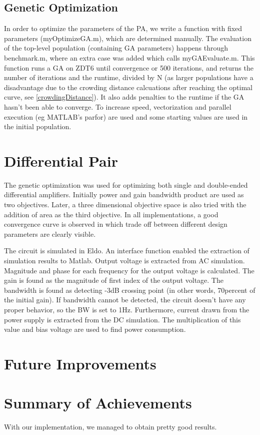 \subsection{Genetic Optimization} 
In order to optimize the parameters of the PA, we write a function with fixed parameters (myOptimizeGA.m), which are determined manually.
The evaluation of the top-level population (containing GA parameters) happens through benchmark.m, where an extra case was added which calls myGAEvaluate.m.
This function runs a GA on ZDT6 until convergence or 500 iterations, and returns the number of iterations and the runtime, divided by N (as larger populations have a disadvantage due to the crowding distance calcuations after reaching the optimal curve, see \ref{crowdingDistance}). It also adds penalties to the runtime if the GA hasn't been able to converge.
To increase speed, vectorization and parallel execution (eg MATLAB's parfor) are used and some starting values are used in the initial population. \\

\section{Differential Pair} 

The genetic optimization was used for optimizing both single and double-ended differential amplifiers. Initially power and gain bandwidth product are used as two objectives. Later, a three dimensional objective space is also tried with the addition of area as the third objective. In all implementations, a good convergence curve is observed in which trade off between different design parameters are clearly visible. 

The circuit is simulated in Eldo. An interface function enabled the extraction of simulation results to Matlab. Output voltage is extracted from AC simulation. Magnitude and phase for each frequency for the output voltage is calculated. The gain is found as the magnitude of first index of the output voltage. The bandwidth is found as detecting -3dB crossing point (in other words, 70percent of the initial gain). If bandwidth cannot be detected, the circuit doesn't have any proper behavior, so the BW is set to 1Hz. Furthermore, current drawn from the power supply is extracted from the DC simulation. The multiplication of this value and bias voltage are used to find power consumption.


\section{Future Improvements}
\section{Summary of  Achievements}\label{summary}

With our implementation, we managed to obtain pretty good results. 
